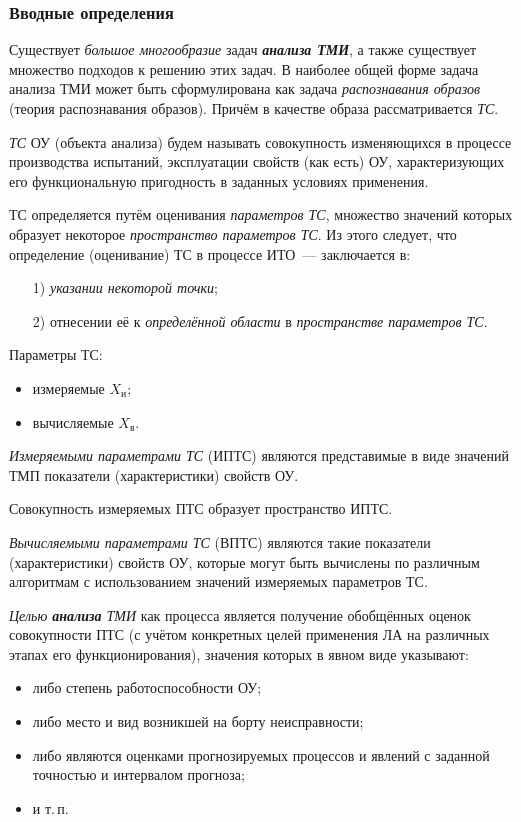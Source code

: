 \subsubsection{Вводные определения}

Существует \emph{большое многообразие} задач \textbf{\emph{анализа
    ТМИ}}, а также существует множество подходов к решению этих
задач. В наиболее общей форме задача анализа ТМИ может быть
сформулирована как задача \emph{распознавания образов} (теория
распознавания образов). Причём в качестве образа рассматривается
\emph{ТС}.

\begin{defin}
  \emph{ТС} ОУ (объекта анализа) будем называть совокупность
  изменяющихся в процессе производства испытаний, эксплуатации свойств
  (как есть) ОУ, характеризующих его функциональную пригодность в
  заданных условиях применения.
\end{defin}

ТС определяется путём оценивания \emph{параметров ТС}, множество
значений которых образует некоторое \emph{пространство параметров
  ТС}. Из этого следует, что определение (оценивание) ТС в процессе ИТО~---
заключается в:
\begin{enumerate}
\item[1)] \emph{указании некоторой точки};
\item[2)] отнесении её к \emph{определённой области} в
  \emph{пространстве параметров ТС}.
\end{enumerate}

Параметры ТС:
\begin{itemize}
\item измеряемые $X_и$;
\item вычисляемые $X_в$.
\end{itemize}

\begin{defin}
  \emph{Измеряемыми параметрами ТС} (ИПТС) являются представимые в
  виде значений ТМП показатели (характеристики) свойств ОУ.

  Совокупность измеряемых ПТС образует пространство ИПТС.

  \emph{Вычисляемыми параметрами ТС} (ВПТС) являются такие показатели
  (характеристики) свойств ОУ, которые могут быть вычислены по
  различным алгоритмам с использованием значений измеряемых параметров ТС.
\end{defin}

\begin{defin}
  \emph{Целью \textbf{анализа} ТМИ} как процесса является получение
  обобщённых оценок совокупности ПТС (с учётом конкретных целей
  применения ЛА на различных этапах его функционирования), значения которых в явном виде указывают:
  \begin{itemize}
  \item либо степень работоспособности ОУ;
  \item либо место и вид возникшей на борту неисправности;
  \item либо являются оценками прогнозируемых процессов и явлений с
    заданной точностью и интервалом прогноза;
  \item и т.\,п.
  \end{itemize}
\end{defin}

